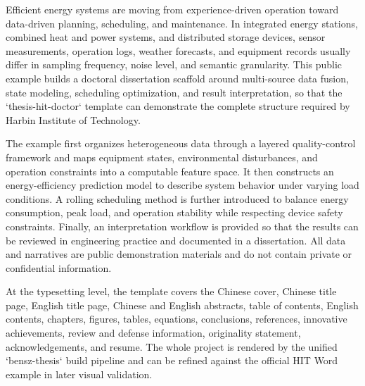 
Efficient energy systems are moving from experience-driven operation toward data-driven planning, scheduling, and maintenance. In integrated energy stations, combined heat and power systems, and distributed storage devices, sensor measurements, operation logs, weather forecasts, and equipment records usually differ in sampling frequency, noise level, and semantic granularity. This public example builds a doctoral dissertation scaffold around multi-source data fusion, state modeling, scheduling optimization, and result interpretation, so that the `thesis-hit-doctor` template can demonstrate the complete structure required by Harbin Institute of Technology.

The example first organizes heterogeneous data through a layered quality-control framework and maps equipment states, environmental disturbances, and operation constraints into a computable feature space. It then constructs an energy-efficiency prediction model to describe system behavior under varying load conditions. A rolling scheduling method is further introduced to balance energy consumption, peak load, and operation stability while respecting device safety constraints. Finally, an interpretation workflow is provided so that the results can be reviewed in engineering practice and documented in a dissertation. All data and narratives are public demonstration materials and do not contain private or confidential information.

At the typesetting level, the template covers the Chinese cover, Chinese title page, English title page, Chinese and English abstracts, table of contents, English contents, chapters, figures, tables, equations, conclusions, references, innovative achievements, review and defense information, originality statement, acknowledgements, and resume. The whole project is rendered by the unified `bensz-thesis` build pipeline and can be refined against the official HIT Word example in later visual validation.

\hitKeywordsEnLine
